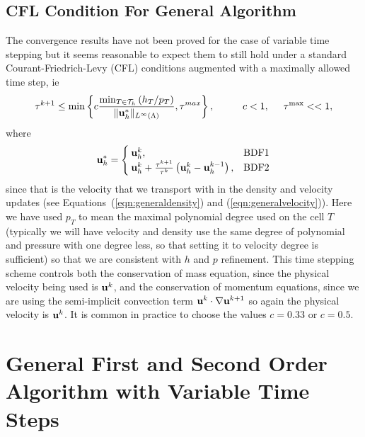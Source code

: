 \documentclass[letterpaper]{erdc}
\begin{document}
\subsection{CFL Condition For General Algorithm}\label{sec:CFLgeneralalgorithm}
The convergence results have not been proved for the case of variable time stepping but it seems reasonable to expect them to still hold under a standard Courant-Friedrich-Levy (CFL) conditions augmented with a maximally allowed time step, ie
\begin{equation}
  \tau^{k+1} \leq \min \left\{c \frac{\min_{T\in\mathcal{T}_h}\left(h_{T}/p_T\right)}{\|\textbf{u}_h^{*}\|_{L^{\infty}(\Lambda)}}, \tau^{max}\right\}, \hspace{1cm} c<1, \hspace{0.5cm}\tau^{\max} << 1,
\end{equation}
where 
\begin{equation}
  \ub_h^{*} = \begin{cases} \ub_h^{k}, & \mbox{BDF1}\\ \ub_h^{k}+ \frac{\tau^{k+1}}{\tau^{k}}\left(\ub_h^{k} - \ub_h^{k-1}\right),& $\mbox{BDF2}$ \end{cases}
\end{equation}
since that is the velocity that we transport with in the density and velocity updates (see Equations~(\ref{eqn:generaldensity}) and (\ref{eqn:generalvelocity})).
Here we have used $p_T$ to mean the maximal polynomial degree used on the cell $T$ (typically we will have velocity and density use the same degree of polynomial and pressure with one degree less, so that setting it to velocity degree is sufficient) so that we are consistent with $h$ and $p$ refinement.  This time stepping scheme controls both the conservation of mass equation, since the physical velocity being used is $\textbf{u}^{k}$, and the conservation of momentum equations, since we are using the semi-implicit convection term $\textbf{u}^{k}\cdot\nabla\textbf{u}^{k+1}$ so again the physical velocity is $\textbf{u}^{k}$.  It is common in practice to choose the values $c=0.33$ or $c=0.5$.




%
%
%
\section{General First and Second Order Algorithm with Variable Time Steps}\label{sec:GeneralAlgorithm}
\end{document}
